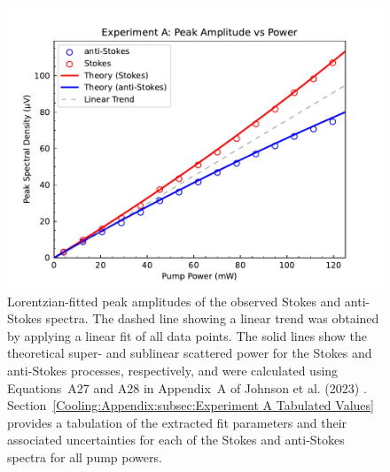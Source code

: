 \begin{figure}[t!]
  \centering
  \includegraphics[width=\textwidth]{figs/2-Cooling/P-O Heights vs Pow.pdf}
  \caption[Lorentzian-fitted peak amplitudes of the observed Stokes and anti-Stokes spectra.]{Lorentzian-fitted peak amplitudes of the observed Stokes and anti-Stokes spectra. The dashed line showing a linear trend was obtained by applying a linear fit of all data points. The solid lines show the theoretical super- and sublinear scattered power for the Stokes and anti-Stokes processes, respectively, and were calculated using Equations~A27 and A28 in Appendix~A of Johnson et al. (2023) \cite{johnson2023laser}. Section~\ref{Cooling:Appendix:subsec:Experiment A Tabulated Values} provides a tabulation of the extracted fit parameters and their associated uncertainties for each of the Stokes and anti-Stokes spectra for all pump powers.}
  \label{fig:Cooling:P-O Heights vs Pow}
\end{figure}

